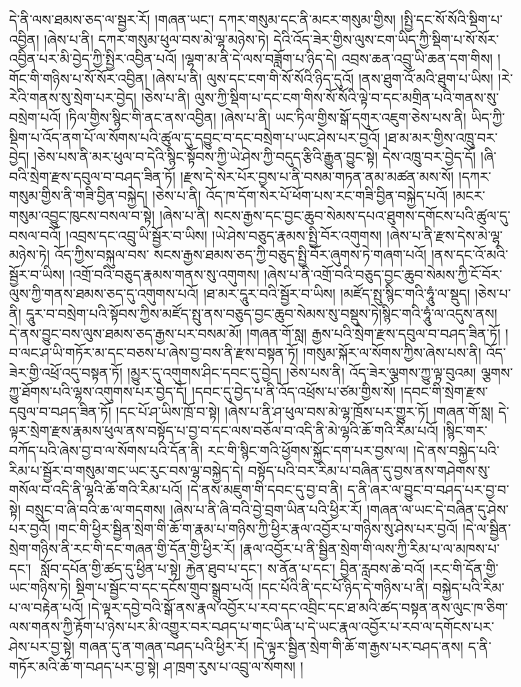 དེ་ནི་ལས་ཐམས་ཅད་ལ་སྦྱར་རོ། །གཞན་ཡང་། དཀར་གསུམ་དང་ནི་མངར་གསུམ་གྱིས། །སྤྱི་དང་སོ་སོའི་སྡིག་པ་འབྱིན། །ཞེས་པ་ནི། དཀར་གསུམ་ཕུལ་བས་མེ་ལྷ་མཉེས་ཏེ། དེའི་འོད་ཟེར་གྱིས་ལུས་ངག་ཡིད་ཀྱི་སྡིག་པ་སོ་སོར་འབྱིན་པར་མི་བྱེད་ཀྱི་སྤྱིར་འབྱིན་པའོ། །ལྷག་མ་ནི་དེ་ལས་བཟློག་པ་ཉིད་དེ། འབྲས་ཆན་འབྲུ་ཡི་ཆན་དག་གིས། །གོང་གི་གཉིས་པ་སོ་སོར་འབྱིན། །ཞེས་པ་ནི། ལུས་དང་ངག་གི་སོ་སོའི་ཉིད་དུའོ། །ནས་ཐུག་འོ་མའི་ཐུག་པ་ཡིས། །རེ་རེའི་གནས་སུ་སྲེག་པར་བྱེད། །ཅེས་པ་ནི། ལུས་ཀྱི་སྡིག་པ་དང་ངག་གིས་སོ་སོའི་ལྟེ་བ་དང་མགྲིན་པའི་གནས་སུ་བསྲེག་པའོ། །ཏིལ་གྱིས་སྙིང་གི་ནང་ནས་འབྱིན། །ཞེས་པ་ནི། ཡང་ཏིལ་གྱིས་སྒོ་དགུར་འཇུག་ཅེས་པས་ནི། ཡིད་ཀྱི་སྡིག་པ་འོད་ནག་པོ་ལ་སོགས་པའི་ཚུལ་དུ་དབྱུང་བ་དང་བསྲེག་པ་ཡང་ཤེས་པར་བྱའོ། །ཐ་མ་མར་གྱིས་འཁྲུ་བར་བྱེད། །ཅེས་པས་ནི་མར་ཕུལ་བ་དེའི་སྙིང་སྟོབས་ཀྱི་ཡེ་ཤེས་ཀྱི་བདུད་རྩིའི་རྒྱུན་བྱུང་སྟེ། དེས་འཁྲུ་བར་བྱེད་དོ། །ཞི་བའི་སྲེག་རྫས་དབུལ་བ་བཤད་ཟིན་ཏོ། །རྫས་དེ་སེར་པོར་བྱས་པ་ནི་བསམ་གཏན་ནམ་མཚན་མས་སོ། །དཀར་གསུམ་གྱིས་ནི་གཟི་བྱིན་བསྐྱེད། །ཅེས་པ་ནི། འོད་ཁ་དོག་སེར་པོ་ཕོག་པས་རང་གཟི་བྱིན་བསྐྱེད་པའོ། །མངར་གསུམ་འབྱུང་ཁུངས་བསལ་བ་སྟེ། །ཞེས་པ་ནི། སངས་རྒྱས་དང་བྱང་ཆུབ་སེམས་དཔའ་ཐུགས་དགོངས་པའི་ཚུལ་དུ་བསལ་བའོ། །འབྲས་དང་འབྲུ་ཡི་སྦྱོར་བ་ཡིས། །ཡེ་ཤེས་བཅུད་རྣམས་སྤྱི་བོར་འགུགས། །ཞེས་པ་ནི་རྫས་དེས་མེ་ལྷ་མཉེས་ཏེ། འོད་ཀྱིས་བསྐུལ་བས་​ སངས་རྒྱས་ཐམས་ཅད་ཀྱི་བཅུད་སྤྱི་བོར་ཞུགས་ཏེ་གཞག་པའོ། །ནས་དང་འོ་མའི་སྦྱོར་བ་ཡིས། །འགྲོ་བའི་བཅུད་རྣམས་གནས་སུ་འགུགས། །ཞེས་པ་ནི་འགྲོ་བའི་བཅུད་བྱང་ཆུབ་སེམས་ཀྱི་ངོ་བོར་ལུས་ཀྱི་གནས་ཐམས་ཅད་དུ་འགུགས་པའོ། །ཐ་མར་དཱུར་བའི་སྦྱོར་བ་ཡིས། །མཛོད་སྤུ་སྙིང་གའི་ཧཱུཾ་ལ་སྡུད། །ཅེས་པ་ནི། དཱུར་བ་བསྲེག་པའི་སྟོབས་ཀྱིས་མཛོད་སྤུ་ནས་བཅུད་བྱང་ཆུབ་སེམས་སུ་བསྡུས་ཏེ།སྙིང་གའི་ཧཱུཾ་ལ་འདུས་ནས། དེ་ནས་བྱུང་བས་ལུས་ཐམས་ཅད་རྒྱས་པར་བསམ་མོ། །གཞན་གོ་སླ། རྒྱས་པའི་སྲེག་རྫས་དབུལ་བ་བཤད་ཟིན་ཏོ། །བ་ལང་ཤ་ཡི་གཏོར་མ་དང་བཅས་པ་ཞེས་བྱ་བས་ནི་རྫས་བསྟན་ཏོ། །གསུམ་སྐོར་ལ་སོགས་ཀྱིས་ཞེས་པས་ནི། འོད་ཟེར་གྱི་འཕྲོ་འདུ་བསྟན་ཏོ། །མྱུར་དུ་འགུགས་ཤིང་དབང་དུ་བྱེད། །ཅེས་པས་ནི། འོད་ཟེར་ལྕགས་ཀྱུ་ལྟ་བུའམ། ལྕགས་ཀྱུ་ཐོགས་པའི་ལྷས་འགུགས་པར་བྱེད་དོ། །དབང་དུ་བྱེད་པ་ནི་འོད་འཕྲོས་པ་ཙམ་གྱིས་སོ། །དབང་གི་སྲེག་རྫས་དབུལ་བ་བཤད་ཟིན་ཏོ། །དང་པོ་ཤ་ཡིས་ཁྲོ་བ་སྟེ། །ཞེས་པ་ནི་ཤ་ཕུལ་བས་མེ་ལྷ་ཁྲོས་པར་གྱུར་ཏོ། །གཞན་གོ་སླ། དེ་ལྟར་སྲེག་རྫས་རྣམས་ཕུལ་ནས་བསྟོད་པ་བྱ་བ་དང་ལས་བཅོལ་བ་འདི་ནི་མེ་ལྷའི་ཆོ་གའི་རིམ་པའོ། །སྙིང་གར་བཀོད་པའི་ཞེས་བྱ་བ་ལ་སོགས་པའི་དོན་ནི། རང་གི་སྙིང་གའི་ཕྱོགས་སྐྱོང་དག་པར་བྱས་ལ། །དེ་ནས་བསྐྱེད་པའི་རིམ་པ་སྦྱོར་བ་གསུམ་གང་ཡང་རུང་བས་ལྷ་བསྐྱེད་དེ། བསྟོད་པའི་བར་རིམ་པ་བཞིན་དུ་བྱས་ནས་གཤེགས་སུ་གསོལ་བ་འདི་ནི་ལྷའི་ཆོ་གའི་རིམ་པའོ། །དེ་ནས་མཇུག་གི་དབང་དུ་བྱ་བ་ནི། ད་ནི་ཞར་ལ་བྱུང་བ་བཤད་པར་བྱ་བ་སྟེ། བསྲུང་བ་ཞི་བའི་ཆ་ལ་གདགས། །ཞེས་པ་ནི་ཞི་བའི་བྱེ་བྲག་ཡིན་པའི་ཕྱིར་རོ། །གཞན་ལ་ཡང་དེ་བཞིན་དུ་ཤེས་པར་བྱའོ། །གང་གི་ཕྱིར་སྦྱིན་སྲེག་གི་ཆོ་ག་རྣམ་པ་གཉིས་ཀྱི་ཕྱིར་རྣལ་འབྱོར་པ་གཉིས་སུ་ཤེས་པར་བྱའོ། །དེ་ལ་སྦྱིན་སྲེག་གཉིས་ནི་རང་གི་དང་གཞན་གྱི་དོན་གྱི་ཕྱིར་རོ། །རྣལ་འབྱོར་པ་ནི་སྦྱིན་སྲེག་གི་ལས་ཀྱི་རིམ་པ་ལ་མཁས་པ་དང་།  ​ སློབ་དཔོན་གྱི་ཚད་དུ་ཕྱིན་པ་སྟེ། རྐྱེན་ཐུབ་པ་དང་། ས་ནོན་པ་དང་། བྱིན་རླབས་ཆེ་བའོ། །རང་གི་དོན་གྱི་ཡང་གཉིས་ཏེ། སྡིག་པ་སྦྱོང་བ་དང་དངོས་གྲུབ་སྒྲུབ་པའོ། །དང་པོའི་ནི་དང་པོ་ཉིད་དེ་གཉིས་པ་ནི། བསྐྱེད་པའི་རིམ་པ་ལ་བརྟེན་པའོ། །དེ་ལྟར་དབྱེ་བའི་སྒོ་ནས་རྣལ་འབྱོར་པ་རབ་དང་འབྲིང་དང་ཐ་མའི་ཚད་བསྟན་ནས་ལུང་ཁ་ཅིག་ལས་གནས་ཀྱི་རྟོག་པ་ཉེས་པར་མི་འགྱུར་བར་བཤད་པ་གང་ཡིན་པ་དེ་ཡང་རྣལ་འབྱོར་པ་རབ་ལ་དགོངས་པར་ཤེས་པར་བྱ་སྟེ། གཞན་དུ་ན་གཞན་བཤད་པའི་ཕྱིར་རོ། །དེ་ལྟར་སྦྱིན་སྲེག་གི་ཆོ་ག་རྒྱས་པར་བཤད་ནས། ད་ནི་གཏོར་མའི་ཆོ་ག་བཤད་པར་བྱ་སྟེ། ཤ་ཁྲག་རུས་པ་འབྲུ་ལ་སོགས། །
